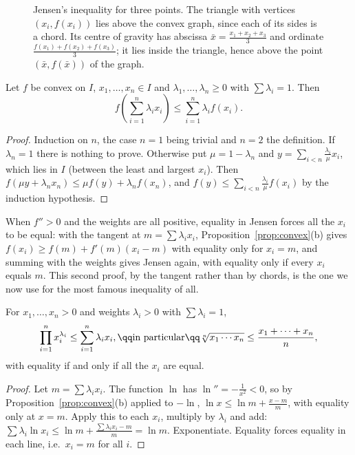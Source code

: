 \begin{figure}[ht]
\centering
{}
\caption{Jensen's inequality for three points. The triangle with vertices $(x_i,f(x_i))$ lies above the convex graph, since each of its sides is a chord. Its centre of gravity has abscissa $\bar x=\frac{x_1+x_2+x_3}3$ and ordinate $\frac{f(x_1)+f(x_2)+f(x_3)}3$; it lies inside the triangle, hence above the point $(\bar x,f(\bar x))$ of the graph.}
\label{fig:jensen}
\end{figure}

\begin{theorem}[Jensen]\label{thm:jensen}
Let $f$ be convex on $I$, $x_1,\dots,x_n\in I$ and $\lambda_1,\dots,\lambda_n\ge0$ with $\sum\lambda_i=1$. Then
\[
f\left(\sum_{i=1}^n\lambda_ix_i\right)\le\sum_{i=1}^n\lambda_if(x_i).
\]
\end{theorem}
\begin{proof}
Induction on $n$, the case $n=1$ being trivial and $n=2$ the definition. If $\lambda_n=1$ there is nothing to prove. Otherwise put
$\mu=1-\lambda_n$ and $y=\sum_{i<n}\frac{\lambda_i}\mu x_i$, which lies in $I$ (between the least and largest $x_i$). Then $f\left(\mu y+\lambda_nx_n\right)\le\mu f(y)+\lambda_nf(x_n)$, and
$f(y)\le\sum_{i<n}\frac{\lambda_i}\mu f(x_i)$ by the induction hypothesis.
\end{proof}

When $f''>0$ and the weights are all positive, equality in Jensen forces all the $x_i$ to be equal: with the tangent at $m=\sum\lambda_ix_i$,
Proposition~\ref{prop:convex}(b) gives $f(x_i)\ge f(m)+f'(m)(x_i-m)$ with equality only for $x_i=m$, and summing with the weights gives Jensen
again, with equality only if every $x_i$ equals $m$. This second proof, by the tangent rather than by chords, is the one we now use for the most
famous inequality of all.

\begin{theorem}[AM--GM]\label{thm:amgm}
For $x_1,\dots,x_n>0$ and weights $\lambda_i>0$ with $\sum\lambda_i=1$,
\[
\begin{gathered}\prod_{i=1}^nx_i^{\lambda_i}\le\sum_{i=1}^n\lambda_ix_i,\qq\text{in particular}\qq\sqrt[n]{x_1\cdots x_n}\le\frac{x_1+\dots+x_n}n,\end{gathered}
\]
with equality if and only if all the $x_i$ are equal.
\end{theorem}
\begin{proof}
Let $m=\sum\lambda_ix_i$. The function $\ln$ has $\ln''=-\frac1{x^2}<0$, so by Proposition~\ref{prop:convex}(b) applied to $-\ln$, $\ln x\le\ln m+\frac{x-m}m$, with equality only at $x=m$. Apply this to each $x_i$, multiply by $\lambda_i$ and add: $\sum\lambda_i\ln x_i\le\ln m+\frac{\sum\lambda_ix_i-m}m=\ln m$. Exponentiate. Equality forces equality in each line, i.e.\ $x_i=m$ for all $i$.
\end{proof}

